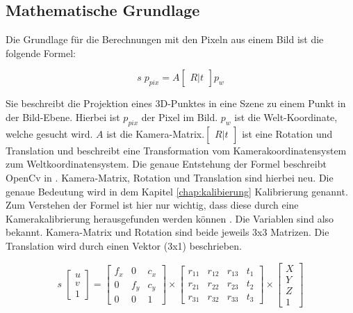 	\subsection{Mathematische Grundlage}
	Die Grundlage für die Berechnungen mit den Pixeln aus einem Bild ist die folgende Formel:
	
	\begin{equation}
	s \; p_{pix} = A \begin{bmatrix} R|t \end{bmatrix} p_w
	\label{eq:basic_trans}
	\end{equation}
	
	Sie beschreibt die Projektion eines 3D-Punktes in eine Szene zu einem Punkt in der Bild-Ebene. Hierbei ist \( p_{pix} \) der Pixel im Bild. \( p_w \) ist die Welt-Koordinate, welche gesucht wird. \( A \) ist die Kamera-Matrix.\( \begin{bmatrix} R|t \end{bmatrix} \) ist eine Rotation und Translation und beschreibt eine Transformation vom Kamerakoordinatensystem zum Weltkoordinatensystem. Die genaue Entstehung der Formel beschreibt OpenCv in \citep[vgl.][]{noauthor_opencv_nodate-2}. Kamera-Matrix, Rotation und Translation sind hierbei neu. Die genaue Bedeutung wird in dem Kapitel \ref{chap:kalibierung} Kalibrierung genannt. Zum Verstehen der Formel ist hier nur wichtig, dass diese durch eine Kamerakalibrierung herausgefunden werden können \citep[vgl.][]{dawson-howe_simple_1994}. Die Variablen sind also bekannt. Kamera-Matrix und Rotation sind beide jeweils 3x3 Matrizen. Die Translation wird durch einen Vektor (3x1) beschrieben. 
	
	\begin{equation}
	s \; \begin{bmatrix}
	u \\ 
	v \\ 
	1
	\end{bmatrix} = \begin{bmatrix}
	f_x & 0 & c_x \\
	0 & f_y & c_y \\
	0 & 0 & 1
	\end{bmatrix} \times \begin{bmatrix}
	r_{11} & r_{12} & r_{13} & t_1 \\ 
	r_{21} & r_{22} & r_{23} & t_2 \\ 
	r_{31} & r_{32} & r_{33} & t_3
	\end{bmatrix} \times \begin{bmatrix}
	X \\ 
	Y \\ 
	Z \\
	1
	\end{bmatrix}
	\label{eq:basic_trans_complete}
	\end{equation}
	
